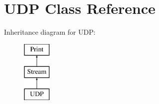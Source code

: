 \hypertarget{class_u_d_p}{}\section{U\+D\+P Class Reference}
\label{class_u_d_p}
Inheritance diagram for U\+D\+P\+:\begin{figure}[H]
\begin{center}
\leavevmode
\includegraphics[height=3.000000cm]{class_u_d_p}
\end{center}
\end{figure}
